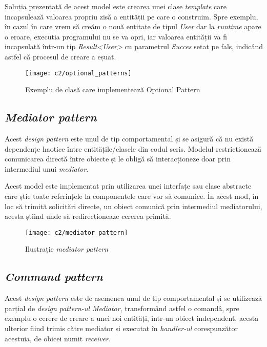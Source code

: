 Soluția prezentată de acest model este crearea unei clase \textit{template} care incapsulează valoarea propriu zisă a entității pe care o construim. Spre exemplu, în cazul în care vrem să creăm o nouă entitate de tipul \textit{User} dar la \textit{runtime} apare o eroare, executia programului nu se va opri, iar valoarea entității va fi incapsulată într-un tip   \textit{Result\textless User\textgreater} cu parametrul \textit{Succes} setat pe fals, indicând astfel că procesul de creare a eșuat.\\

\begin{figure}[h]
	\centering
	
	\texttt{[image: c2/optional\_patterns]}
	\caption{Exemplu de clasă care implementează Optional Pattern}
\end{figure}

\subsection*{\textit{Mediator pattern}}
Acest \textit{design pattern} este unul de tip comportamental și se asigură că nu există dependențe haotice între entitățile/clasele din codul scris. Modelul restrictionează comunicarea directă între obiecte și le obligă să interacționeze doar prin intermediul unui \textit{mediator}.

Acest model este implementat prin utilizarea unei interfațe sau clase abstracte care știe toate referințele la componentele care vor să comunice. În acest mod, în loc să trimită solicitări directe, un obiect comunică prin intermediul mediatorului, acesta știind unde să redirecționeaze cererea primită.


\begin{figure}[h]
	\centering
	
	\texttt{[image: c2/mediator\_pattern]}
	\caption{Ilustrație \textit{mediator pattern}}
\end{figure}

	\newpage
\subsection*{\textit{Command pattern}}	

Acest \textit{design pattern} este de asemenea unul de tip comportamental și se utilizează parțial de \textit{design pattern-ul Mediator}, transformând astfel o comandâ, spre exemplu o cerere de creare a unei noi entități, într-un obiect independent, acesta ulterior fiind trimis către mediator și executat în \textit{handler-ul} corespunzător acestuia, de obicei numit \textit{receiver}.

